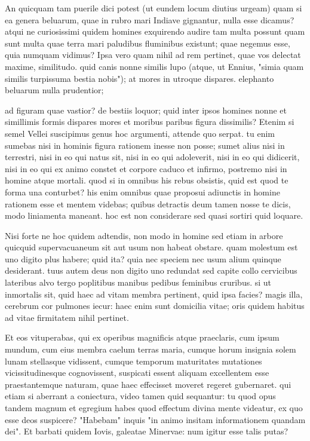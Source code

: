 An quicquam tam puerile dici potest (ut eundem locum diutius urgeam) quam si ea genera beluarum, quae in rubro mari Indiave gignantur, nulla esse dicamus? atqui ne curiosissimi quidem homines exquirendo audire tam multa possunt quam sunt multa quae terra mari paludibus fluminibus existunt; quae negemus esse, quia numquam vidimus? Ipsa vero quam nihil ad rem pertinet, quae vos delectat maxime, similitudo. quid canis nonne similis lupo (atque, ut Ennius, "simia quam similis turpissuma bestia nobis"); at mores in utroque dispares. elephanto beluarum nulla prudentior;

 ad figuram quae vastior? de bestiis loquor; quid inter ipsos homines nonne et simillimis formis dispares mores et moribus paribus figura dissimilis? Etenim si semel Vellei suscipimus genus hoc argumenti, attende quo serpat. tu enim sumebas nisi in hominis figura rationem inesse non posse; sumet alius nisi in terrestri, nisi in eo qui natus sit, nisi in eo qui adoleverit, nisi in eo qui didicerit, nisi in eo qui ex animo constet et corpore caduco et infirmo, postremo nisi in homine atque mortali. quod si in omnibus his rebus obsistis, quid est quod te forma una conturbet? his enim omnibus quae proposui adiunctis in homine rationem esse et mentem videbas; quibus detractis deum tamen nosse te dicis, modo liniamenta maneant. hoc est non considerare sed quasi sortiri quid loquare.

 Nisi forte ne hoc quidem adtendis, non modo in homine sed etiam in arbore quicquid supervacuaneum sit aut usum non habeat obstare. quam molestum est uno digito plus habere; quid ita? quia nec speciem nec usum alium quinque desiderant. tuus autem deus non digito uno redundat sed capite collo cervicibus lateribus alvo tergo poplitibus manibus pedibus feminibus cruribus. si ut inmortalis sit, quid haec ad vitam membra pertinent, quid ipsa facies? magis illa, cerebrum cor pulmones iecur: haec enim sunt domicilia vitae; oris quidem habitus ad vitae firmitatem nihil pertinet.

 Et eos vituperabas, qui ex operibus magnificis atque praeclaris, cum ipsum mundum, cum eius membra caelum terras maria, cumque horum insignia solem lunam stellasque vidissent, cumque temporum maturitates mutationes vicissitudinesque cognovissent, suspicati essent aliquam excellentem esse praestantemque naturam, quae haec effecisset moveret regeret gubernaret. qui etiam si aberrant a coniectura, video tamen quid sequantur: tu quod opus tandem magnum et egregium habes quod effectum divina mente videatur, ex quo esse deos suspicere? "Habebam" inquis "in animo insitam informationem quandam dei". Et barbati quidem Iovis, galeatae Minervae: num igitur esse talis putas?

